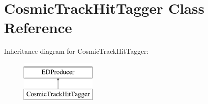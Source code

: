 \hypertarget{classCosmicTrackHitTagger}{\section{Cosmic\-Track\-Hit\-Tagger Class Reference}
\label{classCosmicTrackHitTagger}
}
Inheritance diagram for Cosmic\-Track\-Hit\-Tagger\-:\begin{figure}[H]
\begin{center}
\leavevmode
\includegraphics[height=2.000000cm]{classCosmicTrackHitTagger}
\end{center}
\end{figure}
